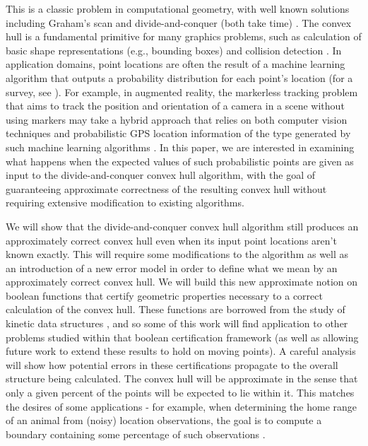 \documentclass[11pt]{article}
\begin{document}
This is a classic problem in computational geometry, with well known solutions including Graham's scan and divide-and-conquer (both take  time) \cite{cgbook, ORourke1998book}.  The convex hull is a fundamental primitive for many graphics problems, such as calculation of basic shape representations (e.g., bounding boxes) \cite{imageProcBook2014} and collision detection \cite{collisionDetection2001}.  In application domains, point locations are often the result of a machine learning algorithm that outputs a probability distribution for each point's location (for a survey, see \cite{Hightower01Location}).  For example, in augmented reality, the markerless tracking problem that aims to track the position and orientation of a camera in a scene without using markers may take a hybrid approach that relies on both computer vision techniques and probabilistic GPS location information of the type generated by such machine learning algorithms \cite{augrealitySurvey2008}.  In this paper, we are interested in examining what happens when the expected values of such probabilistic points are given as input to the divide-and-conquer convex hull algorithm, with the goal of guaranteeing approximate correctness of the resulting convex hull without requiring extensive modification to existing algorithms.

We will show that the divide-and-conquer convex hull algorithm still produces an approximately correct convex hull even when its input point locations aren't known exactly.  This will require some modifications to the algorithm as well as an introduction of a new error model in order to define what we mean by an approximately correct convex hull.  We will build this new approximate notion on boolean functions that certify geometric properties necessary to a correct calculation of the convex hull.  These functions are borrowed from the study of kinetic data structures \cite{Basch99MobileData}, and so some of this work will find application to other problems studied within that boolean certification framework (as well as allowing future work to extend these results to hold on moving points).  A careful analysis will show how potential errors in these certifications propagate to the overall structure being calculated.  The convex hull will be approximate in the sense that only a given percent of the points will be expected to lie within it.  This matches the desires of some applications - for example, when determining the home range of an animal from (noisy) location observations, the goal is to compute a boundary containing some percentage of such observations \cite{animalHomeRanges2010}.
\end{document}
